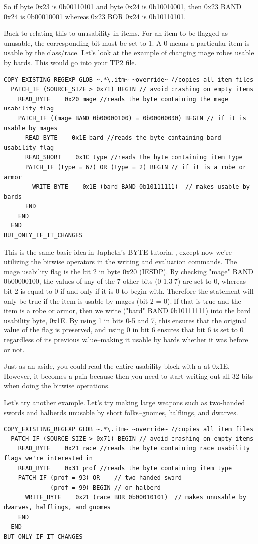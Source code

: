 \documentclass{article}
\def\ttref#1{\ahrefloc{#1}{\tt #1}}
\begin{document}
So if byte 0x23 is 0b00110101 and byte 0x24 is 0b10010001, then 0x23 BAND
0x24 is 0b00010001 whereas 0x23 BOR 0x24 is 0b10110101.

Back to relating this to unusability in items. For an item to be flagged as
unusable, the corresponding bit must be set to 1. A 0 means a particular
item is usable by the class/race. Let's look at the example of changing
mage robes usable by bards. This would go into your TP2 file.

\begin{verbatim}
COPY_EXISTING_REGEXP GLOB ~.*\.itm~ ~override~ //copies all item files
  PATCH_IF (SOURCE_SIZE > 0x71) BEGIN // avoid crashing on empty items
    READ_BYTE    0x20 mage //reads the byte containing the mage usability flag
    PATCH_IF ((mage BAND 0b00000100) = 0b00000000) BEGIN // if it is usable by mages
      READ_BYTE    0x1E bard //reads the byte containing bard usability flag
      READ_SHORT    0x1C type //reads the byte containing item type
      PATCH_IF (type = 67) OR (type = 2) BEGIN // if it is a robe or armor
        WRITE_BYTE    0x1E (bard BAND 0b10111111)  // makes usable by bards
      END
    END
  END
BUT_ONLY_IF_IT_CHANGES
\end{verbatim}

This is the same basic idea in Japheth's BYTE tutorial , except now we're
utilizing the bitwise operators in the writing and evaluation commands. The
mage usability flag is the bit 2 in byte 0x20 (IESDP). By checking "mage"
BAND 0b00000100, the values of any of the 7 other bits (0-1,3-7) are set to
0, whereas bit 2 is equal to 0 if and only if it is 0 to begin with.
Therefore the statement will only be true if the item is usable by mages
(bit 2 = 0). If that is true and the item is a robe or armor, then we write
("bard" BAND 0b10111111) into the bard usability byte, 0x1E. By using 1
in bits 0-5 and 7, this ensures that the original value of the flag is
preserved, and using 0 in bit 6 ensures that bit 6 is set to 0 regardless
of its previous value--making it usable by bards whether it was before or
not.

Just as an aside, you could read the entire usability block with a
\ttref{READ_LONG} at 0x1E. However, it becomes a pain because then you need
to start writing out all 32 bits when doing the bitwise operations.

Let's try another example. Let's try making large weapons such as
two-handed swords and halberds unusable by short folks--gnomes, halflings,
and dwarves.

\begin{verbatim}
COPY_EXISTING_REGEXP GLOB ~.*\.itm~ ~override~ //copies all item files
  PATCH_IF (SOURCE_SIZE > 0x71) BEGIN // avoid crashing on empty items
    READ_BYTE    0x21 race //reads the byte containing race usability flags we're interested in
    READ_BYTE    0x31 prof //reads the byte containing item type
    PATCH_IF (prof = 93) OR    // two-handed sword
             (prof = 99) BEGIN // or halberd
      WRITE_BYTE    0x21 (race BOR 0b00010101)  // makes unusable by dwarves, halflings, and gnomes
    END
  END
BUT_ONLY_IF_IT_CHANGES

\end{verbatim}
\end{document}

